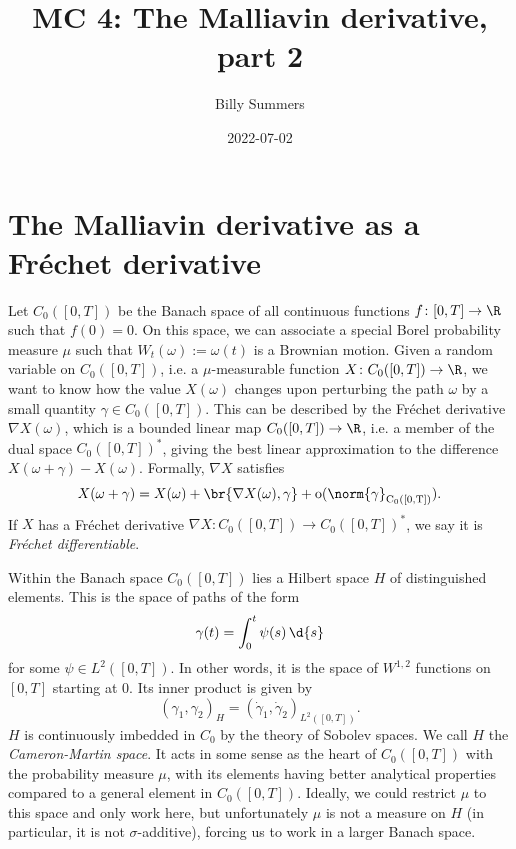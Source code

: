 \documentclass[
    a4paper,
    DIV=14,
    abstract=true,
    numbers=noenddot
]{scrartcl}
\begin{document}
\title{MC 4: The Malliavin derivative, part 2}
\author{Billy Summers}
\date{2022-07-02}
\maketitle

\section{The Malliavin derivative as a Fr\'{e}chet derivative}
Let $C_0([0, T])$ be the Banach space of all continuous functions $f \colon [0,
		T] \to \R$ such that $f(0) = 0$. On this space, we can associate a special
Borel probability measure $\mu$ such that $W_t(\omega) := \omega(t)$ is a
Brownian motion. Given a random variable on $C_0([0, T])$, i.e. a
$\mu$-measurable function $X \colon C_0([0, T]) \to \R$, we want to know how
the value $X(\omega)$ changes upon perturbing the path $\omega$ by a small
quantity $\gamma \in C_0([0, T])$. This can be described by the Fr\'{e}chet
derivative $\nabla{X}(\omega)$, which is a bounded linear map $C_0([0, T]) \to
	\R$, i.e. a member of the dual space $C_0([0, T])^*$, giving the best linear
approximation to the difference $X(\omega + \gamma) - X(\omega)$. Formally,
$\nabla{X}$ satisfies
\[
	X(\omega + \gamma)
	= X(\omega)
	+ \br{\nabla{X}(\omega), \gamma}
	+ \rm{o}(\norm{\gamma}_{C_0([0, T])}).
\]
If $X$ has a Fr\'{e}chet derivative $\nabla{X} \colon C_0([0, T]) \to C_0([0,
			T])^*$, we say it is \emph{Fr\'{e}chet differentiable}.

Within the Banach space $C_0([0, T])$ lies a Hilbert space $H$ of distinguished
elements. This is the space of paths of the form
\[
	\gamma(t) = \int_0^t \psi(s) \, \d{s}
\]
for some $\psi \in L^2([0, T])$. In other words, it is the space of $W^{1, 2}$
functions on $[0, T]$ starting at 0. Its inner product is given by
\[
	(\gamma_1, \gamma_2)_H = (\dot{\gamma}_1, \dot{\gamma}_2)_{L^2([0, T])}.
\]
$H$ is continuously imbedded in $C_0$ by the theory of Sobolev spaces. We call
$H$ the \emph{Cameron-Martin space}. It acts in some sense as the heart
of $C_0([0, T])$ with the probability measure $\mu$, with its elements having
better analytical properties compared to a general element in $C_0([0, T])$.
Ideally, we could restrict $\mu$ to this space and only work here, but
unfortunately $\mu$ is not a measure on $H$ (in particular, it is not
$\sigma$-additive), forcing us to work in a larger Banach space.
\end{document}
